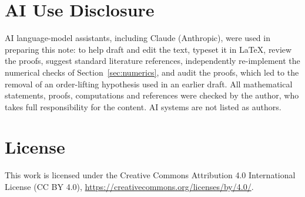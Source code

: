 \documentclass[11pt]{article}
\theoremstyle{definition}
\theoremstyle{remark}
\begin{document}
\section*{AI Use Disclosure}
AI language-model assistants, including Claude (Anthropic), were used in preparing this note: to help draft and edit the text, typeset it in \LaTeX, review the proofs, suggest standard literature references, independently re-implement the numerical checks of Section~\ref{sec:numerics}, and audit the proofs, which led to the removal of an order-lifting hypothesis used in an earlier draft. All mathematical statements, proofs, computations and references were checked by the author, who takes full responsibility for the content. AI systems are not listed as authors.

\section*{License}
This work is licensed under the Creative Commons Attribution 4.0 International License (CC BY 4.0), \url{https://creativecommons.org/licenses/by/4.0/}.
\end{document}
